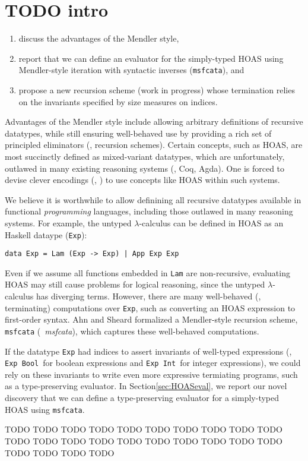 \section{TODO intro}\label{sec:intro}
\begin{enumerate}
	\item discuss the advantages of the Mendler style,
	\item report that we can define an evaluator for the simply-typed HOAS
		using Mendler-style iteration with syntactic inverses
		(\lstinline{msfcata}), and
	\item propose a new recursion scheme (work in progress) whose
		termination relies on the invariants specified by
		size measures on indices.
\end{enumerate}



Advantages of the Mendler style include allowing arbitrary definitions of
recursive datatypes, while still ensuring well-behaved use by providing
a rich set of principled eliminators (\ie, recursion schemes).
Certain concepts, such as HOAS, are most succinctly defined as
mixed-variant datatypes, which are unfortunately, outlawed in many existing
reasoning systems (\eg, Coq, Agda). One is forced to devise clever encodings
(\eg, \cite{PHOAS}) to use concepts like HOAS within such systems.

We believe it is worthwhile to allow definining all recursive datatypes
available in functional \emph{programming} languages, including those outlawed
in many reasoning systems. For example, the untyped $\lambda$-calculus can be
defined in HOAS as an Haskell dataype (\lstinline{Exp}):
\begin{lstlisting}
data Exp = Lam (Exp -> Exp) | App Exp Exp
\end{lstlisting}
Even if we assume all functions embedded in \lstinline{Lam} are non-recursive,
evaluating HOAS may still cause problems for logical reasoning, since
the untyped $\lambda$-calculus has diverging terms. However, there are many
well-behaved (\ie, terminating) computations over \lstinline{Exp}, such as
converting an HOAS expression to first-order syntax.
Ahn and Sheard \cite{AhnShe11} formalized a Mendler-style recursion scheme,
\lstinline{msfcata}  (\aka\ \textit{msfcata}), which captures these
well-behaved computations.

If the datatype \lstinline{Exp} had indices to assert invariants of
well-typed expressions (\eg, \lstinline{Exp Bool}\, for boolean expressions
and \lstinline{Exp Int}\, for integer expressions), we could rely on these
invariants to write even more expressive termiating programs, such as
a type-preserving evaluator. In Section\;\ref{sec:HOASeval}, we report
our novel discovery that we can define a type-preserving evaluator for
a simply-typed HOAS using \lstinline{msfcata}.

TODO TODO TODO TODO TODO TODO TODO TODO TODO TODO TODO TODO
TODO TODO TODO TODO TODO TODO TODO TODO TODO TODO TODO TODO
